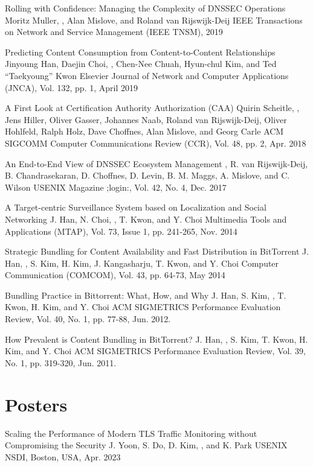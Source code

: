 \documentclass[10pt,letter,sans]{moderncv}        %
\begin{document}
\publication{}
{Rolling with Confidence: Managing the Complexity of DNSSEC Operations}
{Moritz Muller, \myself, Alan Mislove, and Roland van
Rijswijk-Deij}
{IEEE Transactions on Network and Service Management (IEEE TNSM), 2019}

\publication{}
{Predicting Content Consumption from Content-to-Content Relationships}
{Jinyoung Han, Daejin Choi, \myself, Chen-Nee Chuah, Hyun-chul Kim, and Ted ``Taekyoung'' Kwon}
{Elsevier Journal of Network and Computer Applications (JNCA), Vol. 132, pp. 1, April 2019}

\publication{}
{A First Look at Certification Authority Authorization (CAA)}
{Quirin Scheitle, \myself, Jens Hiller, Oliver Gasser, Johannes Naab, Roland van Rijswijk-Deij, Oliver Hohlfeld, Ralph Holz, Dave Choffnes, Alan Mislove, and Georg Carle} 
{ACM SIGCOMM Computer Communications Review (CCR), Vol. 48, pp. 2, Apr. 2018 } 

\publication{}
{An End-to-End View of DNSSEC Ecosystem Management}
{\myself, R. van Rijswijk-Deij, B. Chandrasekaran, D. Choffnes, D. Levin, B. M. Maggs, A. Mislove, and C. Wilson}
{USENIX Magazine ;login:, Vol. 42, No. 4, Dec. 2017}

\publication{}
{A Target-centric Surveillance System based on Localization and Social Networking
}
{J. Han, N. Choi, \myself, T. Kwon, and Y. Choi}
{Multimedia Tools and Applications (MTAP), Vol. 73, Issue 1, pp. 241-265, Nov. 2014}

\publication{}
{Strategic Bundling for Content Availability and Fast Distribution in BitTorrent}
{J. Han, \myself, S. Kim, H. Kim, J. Kangasharju, T. Kwon, and Y. Choi}
{Computer Communication (COMCOM), Vol. 43, pp. 64-73, May 2014}


\publication{}
{Bundling Practice in Bittorrent: What, How, and Why}
{J. Han, S. Kim, \myself, T. Kwon, H. Kim, and Y. Choi}
{ACM SIGMETRICS Performance Evaluation Review, Vol. 40, No. 1, pp. 77-88, Jun. 2012.}

\publication{}
{How Prevalent is Content Bundling in BitTorrent? }
{J. Han, \myself, S. Kim, T. Kwon, H. Kim, and Y. Choi}
{ACM SIGMETRICS Performance Evaluation Review, Vol. 39, No. 1, pp. 319-320, Jun. 2011.}

\section{Posters}
{Scaling the Performance of Modern TLS Traffic Monitoring without Compromising the Security}
{J. Yoon, S. Do, D. Kim, \myself, and K. Park}
{USENIX NSDI, Boston, USA, Apr. 2023}
\end{document}

